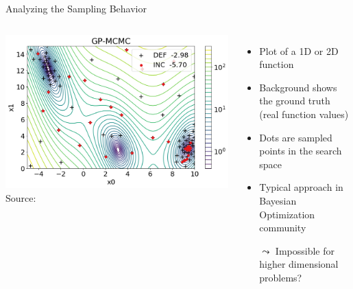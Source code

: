 \begin{frame}[c]{Analyzing the Sampling Behavior}


\begin{columns}
	
	\begin{center}
		\includegraphics[width=1.0\textwidth]{images/gpmcmc_branin_def_vs_inc.png}\\
		Source: 
	\end{center}
	
	
	\begin{itemize}
		\item Plot of a 1D or 2D function
		\pause
		\item Background shows the ground truth\\
		 (real function values)
		\pause
		\item Dots are sampled points in the search space
		\pause
		\item Typical approach in Bayesian Optimization community
		\pause
		\medskip
		\item[$\leadsto$] Impossible for higher dimensional problems?
	\end{itemize}

\end{columns}

\end{frame}

